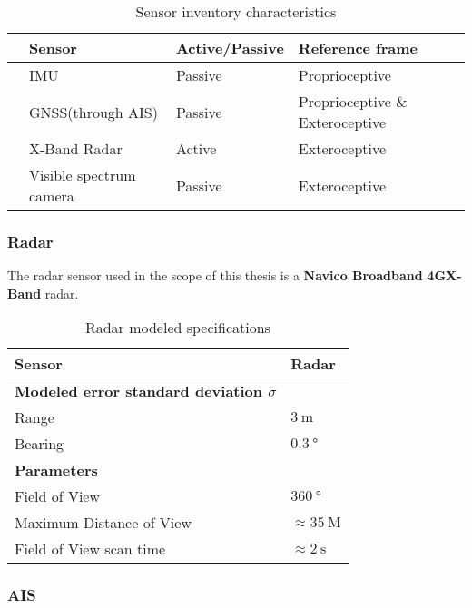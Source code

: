 \begin{table}[H]
		\centering
	\caption{Sensor inventory characteristics}
	\label{tab:sensor_active}
	\begin{tabular}{llll}
		\hline
		& \textbf{Sensor}         & \textbf{Active/Passive} & \textbf{Reference frame} \T \\ \hline
		& IMU                     & Passive                 & Proprioceptive                       \T \\ 
		& GNSS(through AIS)       & Passive                 & Proprioceptive \& Exteroceptive \\
		& X-Band Radar      & Active                  & Exteroceptive                         \\ 
		& Visible spectrum camera & Passive                 & Exteroceptive                         \\ \hline
	\end{tabular}
\end{table}

\subsubsection{Radar}
The radar sensor used in the scope of this thesis is a \textbf{Navico Broadband}  \textbf{4G\tm X-Band} radar.


\begin{table}[]
	\centering
	\caption{Radar modeled specifications}
	\label{tab:radar_specs}
	\begin{tabular}{ll}
		\hline
		\textbf{Sensor} & Radar \T \\ \hline
		\textbf{Modeled error standard deviation $\sigma$} & \T \\
		Range & $\SI{3}{\m}$ \\
		Bearing & $\SI{0.3}{\degree}$ \\ \hline
		\textbf{Parameters} & \T \\
		Field of View & $\SI{360}{\degree}$ \\
		Maximum Distance of View & $\approx \SI{35}{\nauticalmile}$ \\
		Field of View scan time & $\approx \SI{2}{\second}$ \\ \hline
	\end{tabular}
\end{table}
\subsubsection{AIS}


